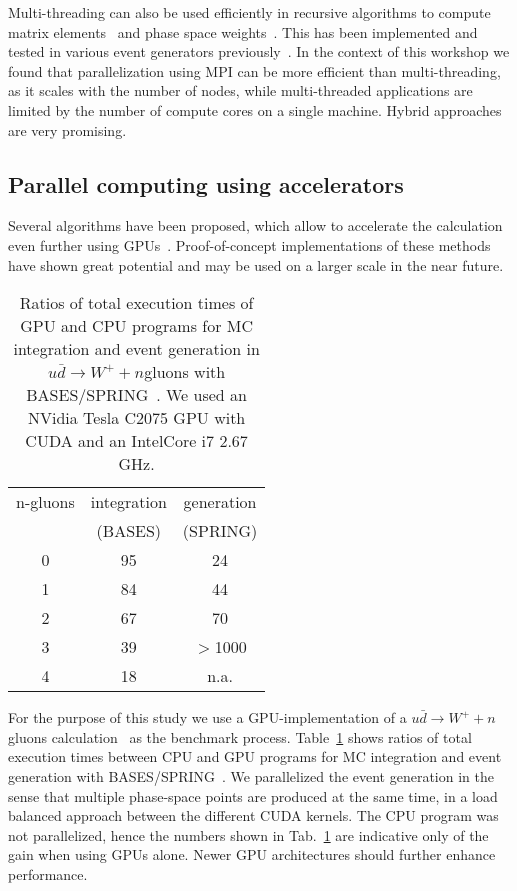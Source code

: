 Multi-threading can also be used efficiently in recursive algorithms
to compute matrix elements~\cite{Berends:1987me} and phase space 
weights~\cite{Byckling:1969sx}. This has been implemented and tested
in various event generators previously~\cite{Gleisberg:2008fv,Giele:2010ks}.  
In the context of this workshop we found that parallelization using MPI 
can be more efficient than multi-threading, as it scales with the number 
of nodes, while multi-threaded applications are limited by the number of 
compute cores on a single machine.  Hybrid approaches are very promising.

\subsection{Parallel computing using accelerators}
Several algorithms have been proposed, which allow to accelerate the
calculation even further using
GPUs~\cite{Hagiwara:2009aq,Giele:2010ks,Hagiwara:2013oka}.
Proof-of-concept implementations of these methods have shown great
potential and may be used on a larger scale in the near future.

\begin{table}
  \centering
  \begin{tabular}{ccc}
    \hline
    n-gluons  & integration &  generation \\
    & (BASES) & (SPRING) \\\hline\hline
    0 &             95  &                24\\
    1 &             84  &                44\\
    2 &             67  &                70\\
    3 &             39  &              $>$1000\\
    4 &             18  &                n.a.\\
    \hline
  \end{tabular}
  \caption{Ratios of total execution times of GPU and CPU programs 
    for MC integration and event generation in $u\bar{d}\to W^++n$gluons
    with BASES/SPRING~\cite{Kawabata:1995th}.
    We used an NVidia Tesla C2075 GPU with CUDA and
    an Intel\registered Core i7 2.67 GHz. 
    \label{tab:gpu}}
\end{table}

For the purpose of this study we use a GPU-implementation of a
$u\bar{d}\to W^++n$ gluons calculation~\cite{Hagiwara:2013oka}
as the benchmark process. Table~\ref{tab:gpu} shows ratios of
total execution times between CPU and GPU programs for MC integration 
and event generation with BASES/SPRING~\cite{Kawabata:1995th}.
We parallelized the event generation in the sense that multiple 
phase-space points are produced at the same time, in a load balanced
approach between the different CUDA kernels. The CPU program was not 
parallelized, hence the numbers shown in Tab.~\ref{tab:gpu} 
are indicative only of the gain when using GPUs alone.
Newer GPU architectures should further enhance performance.  

